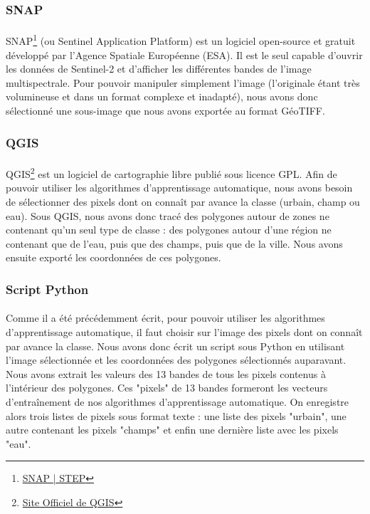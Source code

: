 \documentclass[a4paper,10pt]{article}
\begin{document}
\subsubsection{SNAP}
\paragraph{}
SNAP\footnote{\href{http://step.esa.int/main/toolboxes/snap/}{SNAP | STEP}} (ou Sentinel Application Platform) est un logiciel open-source et gratuit développé par l'Agence Spatiale Européenne (ESA). Il est le seul capable d'ouvrir les données de Sentinel-2 et d'afficher les différentes bandes de l'image multispectrale. Pour pouvoir manipuler simplement l'image (l'originale étant très volumineuse et dans un format complexe et inadapté), nous avons donc sélectionné une sous-image que nous avons exportée au format GéoTIFF.
\subsubsection{QGIS}
\paragraph{}
QGIS\footnote{\href{http://www.qgis.org}{Site Officiel de QGIS}} est un logiciel de cartographie libre publié sous licence GPL. Afin de pouvoir utiliser les algorithmes d'apprentissage automatique, nous avons besoin de sélectionner des pixels dont on connaît par avance la classe (urbain, champ ou eau). Sous QGIS, nous avons donc tracé des polygones autour de zones ne contenant qu'un seul type de classe : des polygones autour d'une région ne contenant que de l'eau, puis que des champs, puis que de la ville. Nous avons ensuite exporté les coordonnées de ces polygones.
\subsubsection{Script Python}
\paragraph{}
Comme il a été précédemment écrit, pour pouvoir utiliser les algorithmes d'apprentissage automatique, il faut choisir sur l'image des pixels dont on connaît par avance la classe. Nous avons donc écrit un script sous Python en utilisant l'image sélectionnée et les coordonnées des polygones sélectionnés auparavant. Nous avons extrait les valeurs des 13 bandes de tous les pixels contenus à l'intérieur des polygones. Ces "pixels" de 13 bandes formeront les vecteurs d'entraînement de nos algorithmes d'apprentissage automatique. On enregistre alors trois listes de pixels sous format texte : une liste des pixels "urbain", une autre contenant les pixels "champs" et enfin une dernière liste avec les pixels "eau".
\end{document}
